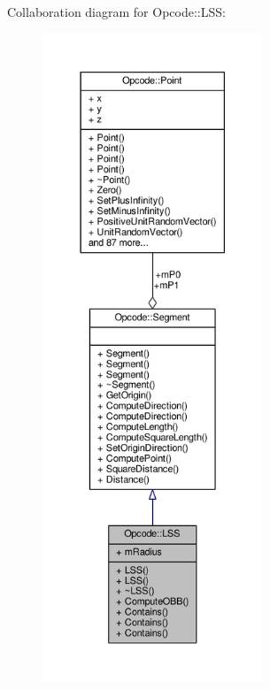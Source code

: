 Collaboration diagram for Opcode\+:\+:L\+SS\+:
\nopagebreak
\begin{figure}[H]
\begin{center}
\leavevmode
\includegraphics[height=550pt]{d2/da0/classOpcode_1_1LSS__coll__graph}
\end{center}
\end{figure}

